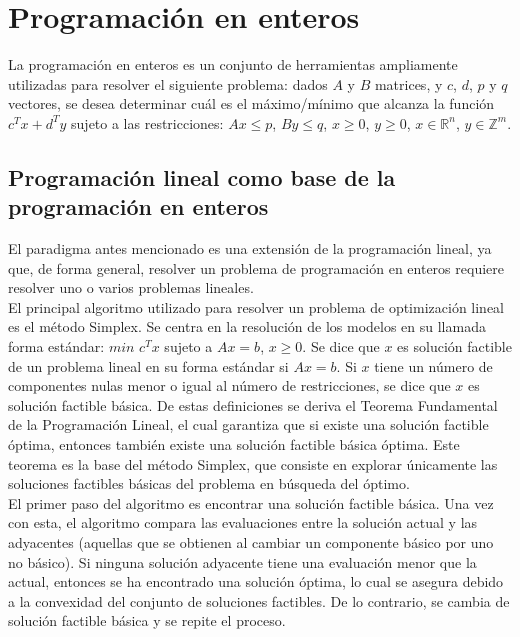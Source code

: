 \documentclass[12pt]{report}
\begin{document}
\section{Programación en enteros}

La programación en enteros es un conjunto de herramientas ampliamente utilizadas para resolver el siguiente problema: dados $A$ y $B$ matrices, y $c$, $d$, $p$ y $q$ vectores, se desea determinar cuál es el máximo/mínimo que alcanza la función $c^Tx+d^Ty$ sujeto a las restricciones: $Ax\leq p$, $By\leq q$, $x\geq 0$, $y\geq 0$, $x\in \mathbb{R} ^n$, $y\in \mathbb{Z}^m$.  


\subsection{Programación lineal como base de la programación en enteros}

El paradigma antes mencionado es una extensión de la programación lineal, ya que, de forma general, resolver un problema de programación en enteros requiere resolver uno o varios problemas lineales.\\

El principal algoritmo utilizado para resolver un problema de optimización lineal es el método Simplex. Se centra en la resolución de los modelos en su llamada forma estándar: $min$ $c^Tx$ sujeto a $Ax=b$, $x\geq 0$.  Se dice que $x$ es solución factible de un problema lineal en su forma estándar si $Ax=b$. Si $x$ tiene un número de componentes nulas menor o igual al número de restricciones, se dice que $x$ es solución factible básica. De estas definiciones se deriva el Teorema Fundamental de la Programación Lineal, el cual garantiza que si existe una solución factible óptima, entonces también existe una solución factible básica óptima. Este teorema es la base del método Simplex, que consiste en explorar únicamente las soluciones factibles básicas del problema en búsqueda del óptimo.\\

El primer paso del algoritmo es encontrar una solución factible básica. Una vez con esta, el algoritmo compara las evaluaciones entre la solución actual y las adyacentes (aquellas que se obtienen al cambiar un componente básico por uno no básico). Si ninguna solución adyacente tiene una evaluación menor que la actual, entonces se ha encontrado una solución óptima, lo cual se asegura debido a la convexidad del conjunto de soluciones factibles. De lo contrario, se cambia de solución factible básica y se repite el proceso.\\
\end{document}

